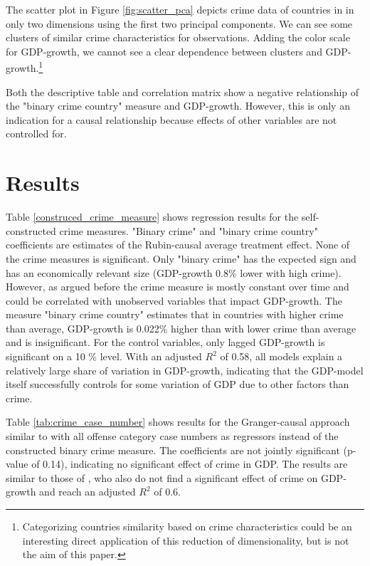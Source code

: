 \documentclass[a4paper,12pt]{article}
\begin{document}
The scatter plot in Figure \ref{fig:scatter_pca} depicts crime data of countries in in only two dimensions using the first two principal components. We can see some clusters of similar crime characteristics for observations. Adding the color scale for GDP-growth, we cannot see a clear dependence between clusters and GDP-growth.\footnote{Categorizing countries similarity based on crime characteristics could be an interesting direct application of this reduction of dimensionality, but is not the aim of this paper.}

Both the descriptive table and correlation matrix show a negative relationship of the "binary crime country" measure and GDP-growth. However, this is only an indication for a causal relationship because effects of other variables are not controlled for.

\section{Results}
\label{Results}


Table \ref{construced_crime_measure} shows regression results for the self-constructed crime measures. "Binary crime" and "binary crime country" coefficients are estimates of the Rubin-causal average treatment effect. 
None of the crime measures is significant. Only "binary crime" has the expected sign and has an economically relevant size (GDP-growth 0.8\% lower with high crime). However, as argued before the crime measure is mostly constant over time and could be correlated with unobserved variables that impact GDP-growth. The measure "binary crime country" estimates that in countries with higher crime than average, GDP-growth is 0.022\% higher than with lower crime than average and is insignificant.
For the control variables, only lagged GDP-growth is significant on a 10 \% level. With an adjusted $R^2$ of 0.58, all models explain a relatively large share of variation in GDP-growth, indicating that the GDP-model itself successfully controls for some variation of GDP due to other factors than crime.

Table \ref{tab:crime_case_number} shows results for the Granger-causal approach similar to \cite{entorf} with all offense category case numbers as regressors instead of the constructed binary crime measure. The coefficients are not jointly significant (p-value of 0.14), indicating no significant effect of crime in GDP. 
The results are similar to those of \cite{entorf}, who also do not find a significant effect of crime on GDP-growth and reach an adjusted $R^2$ of 0.6. 
\end{document}
